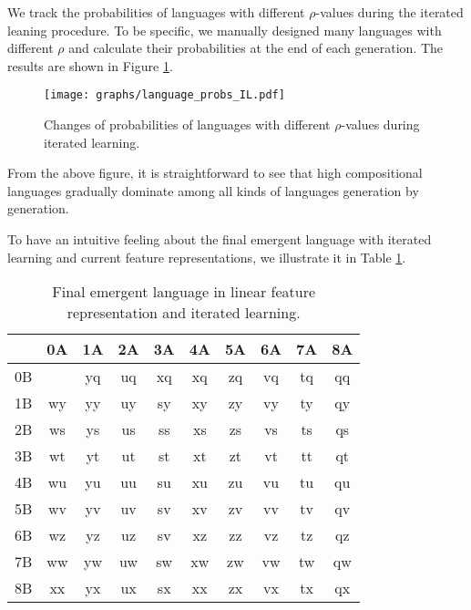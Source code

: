 We track the probabilities of languages with different $\rho$-values during the iterated leaning procedure. To be specific, we manually designed many languages with different $\rho$ and calculate their probabilities at the end of each generation. The results are shown in Figure \ref{fig4.6:lan_prob_IL}.

\begin{figure}[!h]
    \centering
    \texttt{[image: graphs/language\_probs\_IL.pdf]}
    \caption{Changes of probabilities of languages with different $\rho$-values during iterated learning.}
    \label{fig4.6:lan_prob_IL}
\end{figure}

From the above figure, it is straightforward to see that high compositional languages gradually dominate among all kinds of languages generation by generation. 

To have an intuitive feeling about the final emergent language with iterated learning and current feature representations, we illustrate it in Table \ref{tab4.6:emregent_language_referential_perfect}. 

\begin{table}[!h]
    \centering
    \begin{tabular}{|c|c|c|c|c|c|c|c|c|c|}
        \hline
           & 0A & 1A & 2A & 3A & 4A & 5A & 6A & 7A & 8A \\ \hline
        0B &    & yq & uq & xq & xq & zq & vq & tq & qq \\ \hline
        1B & wy & yy & uy & sy & xy & zy & vy & ty & qy \\ \hline
        2B & ws & ys & us & ss & xs & zs & vs & ts & qs \\ \hline
        3B & wt & yt & ut & st & xt & zt & vt & tt & qt \\ \hline
        4B & wu & yu & uu & su & xu & zu & vu & tu & qu \\ \hline
        5B & wv & yv & uv & sv & xv & zv & vv & tv & qv \\ \hline
        6B & wz & yz & uz & sv & xz & zz & vz & tz & qz \\ \hline
        7B & ww & yw & uw & sw & xw & zw & vw & tw & qw \\ \hline
        8B & xx & yx & ux & sx & xx & zx & vx & tx & qx \\ \hline
        \end{tabular}
    \caption{Final emergent language in linear feature representation and iterated learning.}
    \label{tab4.6:emregent_language_referential_perfect}
\end{table}

